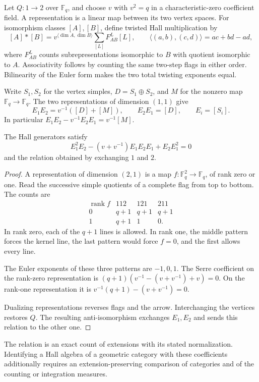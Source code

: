 Let $Q:1\to2$ over $\mathbb F_q$, and choose $v$ with $v^2=q$ in a characteristic-zero coefficient field.
A representation is a linear map between its two vertex spaces.
For isomorphism classes $[A],[B]$, define twisted Hall multiplication by
\[
 [A]*[B]=v^{\langle\dim A,\dim B\rangle}
 \sum_{[L]}F^L_{AB}[L],\qquad
 \langle(a,b),(c,d)\rangle=ac+bd-ad,
\]
where $F^L_{AB}$ counts subrepresentations isomorphic to $B$ with quotient isomorphic to $A$.
Associativity follows by counting the same two-step flags in either order. Bilinearity of the Euler form makes the two total twisting exponents equal.

Write $S_1,S_2$ for the vertex simples, $D=S_1\oplus S_2$, and $M$ for the nonzero map $\mathbb F_q\to\mathbb F_q$.
The two representations of dimension $(1,1)$ give
\[
 E_1E_2=v^{-1}([D]+[M]),\qquad E_2E_1=[D],
 \qquad E_i=[S_i].
\]
In particular $E_1E_2-v^{-1}E_2E_1=v^{-1}[M]$.

\begin{proposition}
\label{prop:alg-hall-serre}
The Hall generators satisfy
\[
 E_1^2E_2-(v+v^{-1})E_1E_2E_1+E_2E_1^2=0
\]
and the relation obtained by exchanging $1$ and $2$.
\end{proposition}
\begin{proof}
A representation of dimension $(2,1)$ is a map $f:\mathbb F_q^2\to\mathbb F_q$, of rank zero or one.
Read the successive simple quotients of a complete flag from top to bottom.
The counts are
\[
\begin{array}{c|ccc}
 \operatorname{rank}f&112&121&211\\\hline
 0&q+1&q+1&q+1\\
 1&q+1&1&0.
\end{array}
\]
In rank zero, each of the $q+1$ lines is allowed.
In rank one, the middle pattern forces the kernel line, the last pattern would force $f=0$, and the first allows every line.

The Euler exponents of these three patterns are $-1,0,1$.
The Serre coefficient on the rank-zero representation is
$(q+1)(v^{-1}-(v+v^{-1})+v)=0$.
On the rank-one representation it is
$v^{-1}(q+1)-(v+v^{-1})=0$.

Dualizing representations reverses flags and the arrow. Interchanging the vertices restores $Q$.
The resulting anti-isomorphism exchanges $E_1,E_2$ and sends this relation to the other one.
\end{proof}

The relation is an exact count of extensions with its stated normalization.
Identifying a Hall algebra of a geometric category with these coefficients additionally requires an extension-preserving comparison of categories and of the counting or integration measures.

